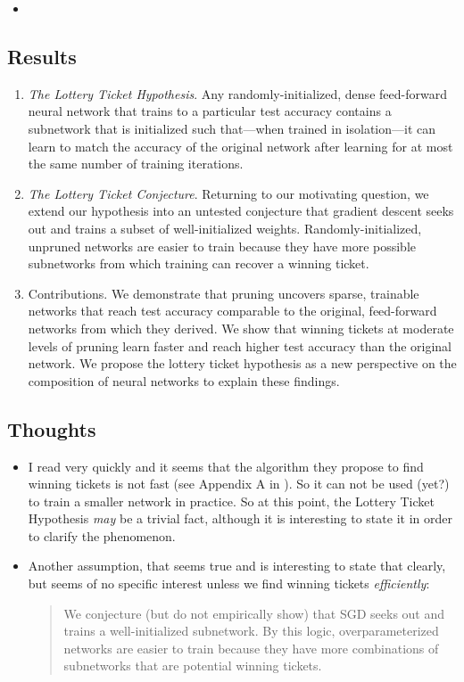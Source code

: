 \documentclass{article}
\begin{document}
\begin{itemize}
	\item 
\end{itemize}


\subsection{Results}

\begin{enumerate}
	\item \emph{The Lottery Ticket Hypothesis}. Any randomly-initialized, dense feed-forward neural network that trains to a particular test accuracy contains a subnetwork that is initialized such that—when trained in isolation—it can learn to match the accuracy of the original network after learning for at most the same number of training iterations.
	\item \emph{The Lottery Ticket Conjecture}. Returning to our motivating question, we extend our hypothesis into an untested conjecture that gradient descent seeks out and trains a subset of well-initialized weights. Randomly-initialized, unpruned networks are easier to train because they have more possible subnetworks from which training can recover a winning ticket.
	\item Contributions.
		\subitem We demonstrate that pruning uncovers sparse, trainable networks that reach test accuracy comparable to the original, feed-forward networks from which they derived.
	 	\subitem We show that winning tickets at moderate levels of pruning learn faster and reach higher test accuracy than the original network.
	 	\subitem  We propose the lottery ticket hypothesis as a new perspective on the composition of neural networks to explain these findings.
	
\end{enumerate}


\subsection{Thoughts}

\begin{itemize}
	\item  I read very quickly and it seems that the algorithm they propose to find winning tickets is not fast (see Appendix A in \cite{frankle_lottery_2018}). So it can not be used (yet?) to train a smaller network in practice. So at this point, the  Lottery Ticket Hypothesis \emph{may} be a trivial  fact, although it is interesting to state it in order to clarify the phenomenon.
	\item Another assumption, that seems true and is interesting to state that clearly, but seems of no specific interest unless we find winning tickets \emph{efficiently}:
	\begin{quote}
		We conjecture (but do not empirically show) that SGD seeks out and trains a well-initialized subnetwork. By this logic, overparameterized networks are easier to train because they have more combinations of subnetworks that are potential winning tickets.
	\end{quote}

\end{itemize}
\end{document}

